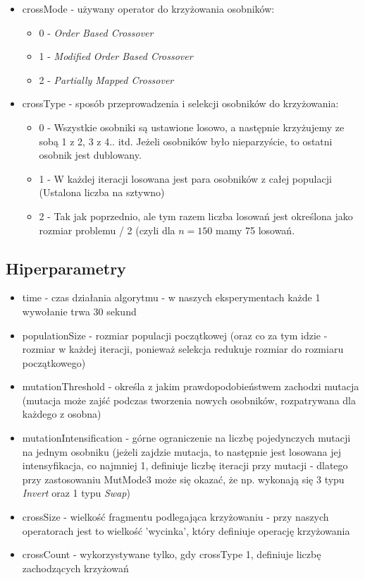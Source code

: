 \documentclass{article}
\begin{document}
\begin{itemize}
	\item crossMode	- używany operator do krzyżowania osobników:
		\begin{itemize}
			\item 0 - \textit{Order Based Crossover}
			\item 1 - \textit{Modified Order Based Crossover}
			\item 2 - \textit{Partially Mapped Crossover}
		\end{itemize}

	\item crossType - sposób przeprowadzenia i selekcji osobników do krzyżowania:
		\begin{itemize}
			\item 0 - Wszystkie osobniki są ustawione losowo, a następnie krzyżujemy ze sobą 1 z 2, 3 z 4.. itd. Jeżeli osobników było nieparzyście, to ostatni osobnik jest dublowany.
			\item 1 - W każdej iteracji losowana jest para osobników z całej populacji (Ustalona liczba na sztywno)
			\item 2 - Tak jak poprzednio, ale tym razem liczba losowań jest określona jako rozmiar problemu / 2 (czyli dla $n = 150$ mamy 75 losowań.
		\end{itemize}
\end{itemize}

\subsection{Hiperparametry}
\begin{itemize}
	\item time - czas działania algorytmu - w naszych eksperymentach każde 1 wywołanie trwa 30 sekund
	\item populationSize - rozmiar populacji początkowej (oraz co za tym idzie - rozmiar w każdej iteracji, ponieważ selekcja redukuje rozmiar do rozmiaru początkowego)
	\item mutationThreshold - określa z jakim prawdopodobieństwem zachodzi mutacja (mutacja może zajść podczas tworzenia nowych osobników, rozpatrywana dla każdego z osobna)
	\item mutationIntensification - górne ograniczenie na liczbę pojedynczych mutacji na jednym osobniku (jeżeli zajdzie mutacja, to następnie jest losowana jej intensyfikacja, co najmniej 1, definiuje liczbę iteracji przy mutacji - dlatego przy zastosowaniu MutMode3 może się okazać, że np. wykonają się 3 typu \textit{Invert} oraz 1 typu \textit{Swap})
	\item crossSize - wielkość fragmentu podlegająca krzyżowaniu - przy naszych operatorach jest to wielkość 'wycinka', który definiuje operację krzyżowania
	\item crossCount - wykorzystywane tylko, gdy crossType 1, definiuje liczbę zachodzących krzyżowań
\end{itemize}
\end{document}
